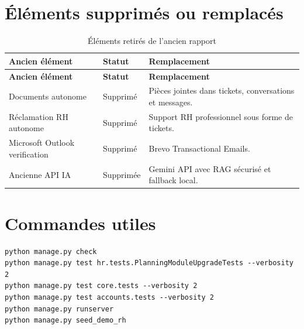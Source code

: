 \documentclass[12pt,a4paper]{report}
\begin{document}
\section{Éléments supprimés ou remplacés}
\begin{longtable}{p{4cm}p{5cm}p{5cm}}
\caption{Éléments retirés de l'ancien rapport}\label{tab:suppressions}\\
\toprule
\textbf{Ancien élément} & \textbf{Statut} & \textbf{Remplacement}\\
\midrule
\endfirsthead
\toprule
\textbf{Ancien élément} & \textbf{Statut} & \textbf{Remplacement}\\
\midrule
\endhead
Documents autonome & Supprimé & Pièces jointes dans tickets, conversations et messages.\\
Réclamation RH autonome & Supprimé & Support RH professionnel sous forme de tickets.\\
Microsoft Outlook verification & Supprimé & Brevo Transactional Emails.\\
Ancienne API IA & Supprimée & Gemini API avec RAG sécurisé et fallback local.\\
\bottomrule
\end{longtable}

\section{Commandes utiles}
\begin{verbatim}
python manage.py check
python manage.py test hr.tests.PlanningModuleUpgradeTests --verbosity 2
python manage.py test core.tests --verbosity 2
python manage.py test accounts.tests --verbosity 2
python manage.py runserver
python manage.py seed_demo_rh
\end{verbatim}
\end{document}
